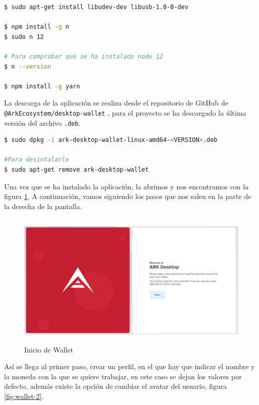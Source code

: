 \begin{lstlisting}[language=Bash,caption=Instalaciones previas a la aplicación ARK Wallet, label=cod:install-wallet, style=Consola]
$ sudo apt-get install libudev-dev libusb-1.0-0-dev

$ npm install -g n
$ sudo n 12

# Para comprobar que se ha instalado node 12
$ n --version

$ npm install -g yarn
\end{lstlisting}

La descarga de la aplicación se realiza desde el repositorio de GitHub de \texttt{@ArkEcosystem/desktop-wallet} \cite{descargas-wallet}, para el proyecto se ha descargado la última versión del archivo \texttt{.deb}.\\

\begin{lstlisting}[language=Bash,caption=Instalación de la aplicación ARK Wallet, label=cod:install-wallet, style=Consola]
$ sudo dpkg -i ark-desktop-wallet-linux-amd64-<VERSION>.deb

#Para desintalarlo
$ sudo apt-get remove ark-desktop-wallet
\end{lstlisting}


Una vez que se ha instalado la aplicación, la abrimos y nos encontramos con la figura \ref{fig:wallet-1}. A continuación, vamos siguiendo los pasos que nos salen en la parte de la derecha de la pantalla.\\

\begin{figure}[H]
	\centering
	\includegraphics[width=12.5cm,height=6.5cm]{figuras/wallet_1.png}
	\caption{Inicio de Wallet}
	\label{fig:wallet-1}
\end{figure}

\newpage
Así se llega al primer paso, crear un perfil, en el que hay que indicar el nombre y la moneda con la que se quiere trabajar, en este caso se dejan los valores por defecto, además existe la opción de cambiar el avatar del usuario, figura \ref{fig:wallet-2}.

